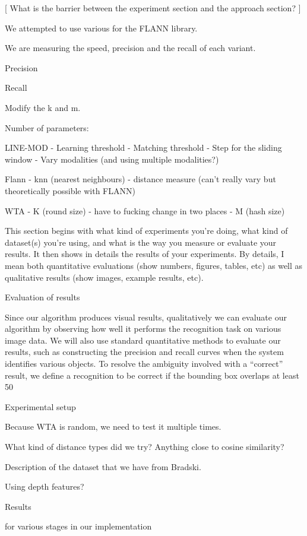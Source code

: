 \documentclass[10pt,twocolumn,letterpaper]{article}
\begin{document}
[ What is the barrier between the experiment section and the approach section? ]

We attempted to use various for the FLANN library.

We are measuring the speed, precision and the recall of each variant.

Precision

Recall

Modify the k and m.

Number of parameters:

LINE-MOD
	- Learning threshold
	- Matching threshold
	- Step for the sliding window
	- Vary modalities (and using multiple modalities?)

Flann
	- knn (nearest neighbours)
	- distance measure (can't really vary but theoretically possible with FLANN)

WTA
	- K (round size) - have to fucking change in two places
	- M (hash size) 


This section begins with what kind of experiments you're doing, what kind of dataset(s) you're using, and what is the way you measure or evaluate your results. It then shows in details the results of your experiments. By details, I mean both quantitative evaluations (show numbers, figures, tables, etc) as well as qualitative results (show images, example results, etc).


Evaluation of results

Since our algorithm produces visual results, qualitatively we can evaluate our algorithm by observing how well it performs the recognition task on various image data. We will also use standard quantitative methods to evaluate our results, such as constructing the precision and recall curves when the system identifies various objects. To resolve the ambiguity involved with a “correct” result, we deﬁne a recognition to be correct if the bounding box overlaps at least 50%

Experimental setup

Because WTA is random, we need to test it multiple times.


What kind of distance types did we try? Anything close to cosine similarity?

Description of the dataset that we have from Bradski. 

Using depth features?

Results

for various stages in our implementation
\end{document}
